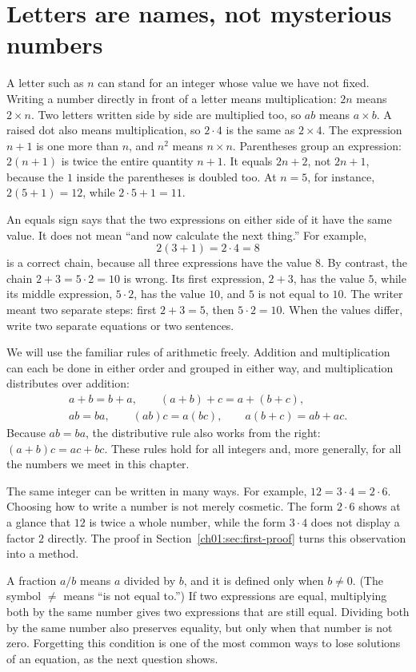 \section{Letters are names, not mysterious numbers}\label{ch01:sec:letters}
A letter such as $n$ can stand for an integer whose value we have not fixed. Writing a number directly in front of a letter means multiplication: $2n$ means $2\times n$. Two letters written side by side are multiplied too, so $ab$ means $a\times b$. A raised dot also means multiplication, so $2\cdot4$ is the same as $2\times4$. The expression $n+1$ is one more than $n$, and $n^2$ means $n\times n$. Parentheses group an expression: $2(n+1)$ is twice the entire quantity $n+1$. It equals $2n+2$, not $2n+1$, because the $1$ inside the parentheses is doubled too. At $n=5$, for instance, $2(5+1)=12$, while $2\cdot5+1=11$.

An equals sign says that the two expressions on either side of it have the same value. It does not mean ``and now calculate the next thing.'' For example,
\[
2(3+1)=2\cdot4=8
\]
is a correct chain, because all three expressions have the value $8$. By contrast, the chain $2+3=5\cdot2=10$ is wrong. Its first expression, $2+3$, has the value $5$, while its middle expression, $5\cdot2$, has the value $10$, and $5$ is not equal to $10$. The writer meant two separate steps: first $2+3=5$, then $5\cdot2=10$. When the values differ, write two separate equations or two sentences.

We will use the familiar rules of arithmetic freely. Addition and multiplication can each be done in either order and grouped in either way, and multiplication distributes over addition:
\begin{gather*}
a+b=b+a,\qquad (a+b)+c=a+(b+c),\\
ab=ba,\qquad (ab)c=a(bc),\qquad a(b+c)=ab+ac.
\end{gather*}
Because $ab=ba$, the distributive rule also works from the right: $(a+b)c=ac+bc$. These rules hold for all integers and, more generally, for all the numbers we meet in this chapter.

The same integer can be written in many ways. For example, $12=3\cdot4=2\cdot6$. Choosing how to write a number is not merely cosmetic. The form $2\cdot6$ shows at a glance that $12$ is twice a whole number, while the form $3\cdot4$ does not display a factor $2$ directly. The proof in Section~\ref{ch01:sec:first-proof} turns this observation into a method.

A fraction $a/b$ means $a$ divided by $b$, and it is defined only when $b\ne0$. (The symbol $\ne$ means ``is not equal to.'') If two expressions are equal, multiplying both by the same number gives two expressions that are still equal. Dividing both by the same number also preserves equality, but only when that number is not zero. Forgetting this condition is one of the most common ways to lose solutions of an equation, as the next question shows.

